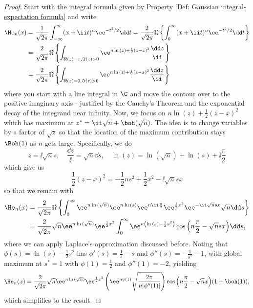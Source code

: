 \begin{proof}
	Start with the integral formula given by Property \ref{Def: Gaussian integral-expectation formula} and write
	\begin{align}
		\He_n(x) & = \frac{1}{\sqrt{2\pi}} \int_{-\infty}^{\infty} (x + \ii t)^n \ee^{-t^2/2} \dd t = \frac{2}{\sqrt{2\pi}} \Re\left\{ \int_{0}^{\infty} (x + \ii t)^n \ee^{-t^2/2} \dd t \right\} \\
		& = \frac{2}{\sqrt{2\pi}} \Re\left\{ \int_{\Re(z) = x, \Im(z)>0} \ee^{n\ln{(z)} + \frac{1}{2}(z-x)^2} \frac{\dd z}{\ii} \right\} \\
		& = \frac{2}{\sqrt{2\pi}} \Re\left\{ \int_{\Re(z) = 0, \Im(z)>0} \ee^{n\ln{(z)} + \frac{1}{2}(z-x)^2} \frac{\dd z}{\ii} \right\}
	\end{align}
	where you start with a line integral in $\C$ and move the contour over to the positive imaginary axis - justified by the Cauchy's Theorem and the exponential decay of the integrand near infinity. Now, we focus on $n\ln{(z)} + \frac{1}{2}(z-x)^2$ which has maximum at $z^* = \ii \sqrt{n} + \boh(\sqrt{n})$. The idea is to change variables by a factor of $\sqrt{z}$ so that the location of the maximum contribution stays $\Boh(1)$ as $n$ gets large. Specifically, we do
	\begin{equation}
		z = \ii \sqrt{n} s, \quad \frac{\dd z}{\ii} = \sqrt{n} \dd s, \quad \ln{(z)} = \ln{(\sqrt{n})} + \ln{(s)} + \ii \frac{\pi}{2}
	\end{equation}  
	which give us
	\begin{equation}
		\frac{1}{2}(z-x)^2 = -\frac{1}{2} ns^2 + \frac{1}{2} x^2 - \ii \sqrt{n} sx	
	\end{equation}
	so that we remain with
	\begin{align}
		\He_n(x) & = \frac{2}{\sqrt{2\pi}} \Re\left\{ \int_{0}^{\infty} \ee^{n\ln{(\sqrt{n})}} \ee^{n\ln{(s)}} \ee^{n\ii\frac{\pi}{2}} \ee^{\frac{1}{2}x^2}\ee^{-\ii\sqrt{n}sx} \sqrt{n} \dd s \right\} \\
		& = \frac{2}{\sqrt{2\pi}} \sqrt{n} \ee^{n\ln{(\sqrt{n})}} \ee^{\frac{1}{2}x^2}  \int_{0}^{\infty} \ee^{n\left(\ln{(s)} - \frac{1}{2}s^2 \right)} \cos{\left(n\frac{\pi}{2} - \sqrt{n} s x\right)} \dd s,
	\end{align}
	where we can apply Laplace's approximation discussed before. Noting that $\phi(s) = \ln{(s)} - \frac{1}{2}s^2$ has $\phi'(s) = \frac{1}{s} - s$ and $\phi''(s) = -\frac{1}{s^2} - 1$, with global maximum at $s^* = 1$ with $\phi(1) = \frac{1}{2}$ and $\phi''(1) = -2$, yielding
	\begin{align}
		 \He_n(x) = \frac{2}{\sqrt{2\pi}} \sqrt{n} \ee^{n\ln{(\sqrt{n})}} \ee^{\frac{1}{2}x^2}  \left( \ee^{n\phi(1)} \sqrt{\frac{2\pi}{n|\phi''(1)|}} \right) \cos{\left(n\frac{\pi}{2} - \sqrt{n}x\right)} (1+\boh(1)),
	\end{align}
	which simplifies to the result.
\end{proof}

